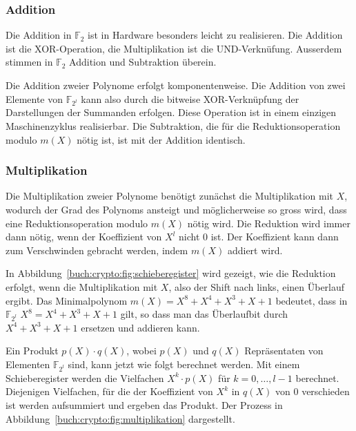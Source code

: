 \subsubsection{Addition}
Die Addition in $\mathbb{F}_2$ ist in Hardware besonders leicht zu
realisieren.
Die Addition ist die XOR-Operation, die Multiplikation ist die UND-Verknüfung.
Ausserdem stimmen in $\mathbb{F}_2$ Addition und Subtraktion überein.

Die Addition zweier Polynome erfolgt komponentenweise.
Die Addition von zwei Elemente von $\mathbb{F}_{2^l}$ kann also
durch die bitweise XOR-Verknüpfung der Darstellungen der Summanden 
erfolgen.
Diese Operation ist in einem einzigen Maschinenzyklus realisierbar.
Die Subtraktion, die für die Reduktionsoperation modulo $m(X)$ nötig
ist, ist mit der Addition identisch.


\subsubsection{Multiplikation}
Die Multiplikation zweier Polynome benötigt zunächst die Multiplikation
mit $X$, wodurch der Grad des Polynoms ansteigt und möglicherweise so
gross wird, dass eine Reduktionsoperation modulo $m(X)$ nötig wird.
Die Reduktion wird immer dann nötig, wenn der Koeffizient von $X^l$
nicht $0$ ist.
Der Koeffizient kann dann zum Verschwinden gebracht werden, indem
$m(X)$ addiert wird.

In Abbildung~\ref{buch:crypto:fig:schieberegister} wird gezeigt,
wie die Reduktion erfolgt, wenn die Multiplikation mit $X$, also der
Shift nach links, einen Überlauf ergibt.
Das Minimalpolynom $m(X)=X^8+X^4+X^3+X+1$ bedeutet, dass in $\mathbb{F}_{2^l}$
$X^8=X^4+X^3+X+1$ gilt, so dass man das Überlaufbit durch 
$X^4+X^3+X+1$ ersetzen und addieren kann.

Ein Produkt $p(X)\cdot q(X)$, wobei $p(X)$ und
$q(X)$ Repräsentaten von Elementen $\mathbb{F}_{2^l}$ sind, kann jetzt
wie folgt berechnet werden.
Mit einem Schieberegister werden die Vielfachen $X^k\cdot p(X)$ 
für $k=0,\dots,l-1$ berechnet.
Diejenigen Vielfachen, für die der Koeffizient von $X^k$ in $q(X)$
von $0$ verschieden ist werden aufsummiert und ergeben das Produkt.
Der Prozess in Abbildung~\ref{buch:crypto:fig:multiplikation}
dargestellt.




